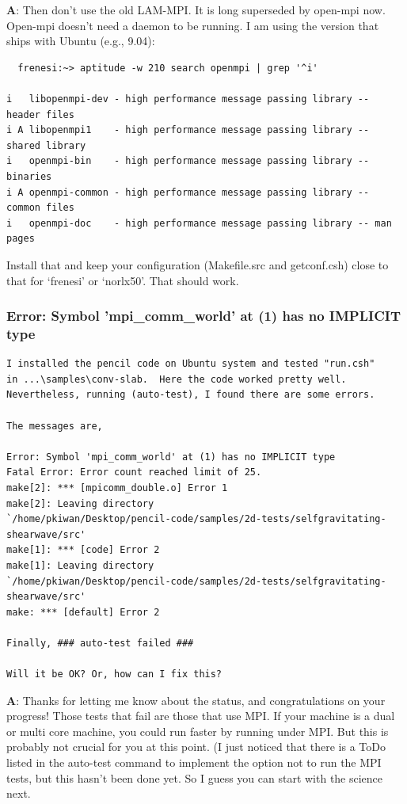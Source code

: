 \documentclass[\mydriver,12pt,twoside,notitlepage,a4paper]{article}
\begin{document}
\medskip

{\bf A}: Then don't use the old LAM-MPI. It is long superseded by open-mpi now.
Open-mpi doesn't need a daemon to be running. I am using the version that
ships with Ubuntu (e.g., 9.04):

\begin{Verbatim}
  frenesi:~> aptitude -w 210 search openmpi | grep '^i'

i   libopenmpi-dev - high performance message passing library -- header files
i A libopenmpi1    - high performance message passing library -- shared library
i   openmpi-bin    - high performance message passing library -- binaries
i A openmpi-common - high performance message passing library -- common files
i   openmpi-doc    - high performance message passing library -- man pages
\end{Verbatim}

Install that and keep your configuration (Makefile.src and getconf.csh)
close to that for `frenesi' or `norlx50'. That should work.

\subsubsection{Error: Symbol 'mpi_comm_world' at (1) has no IMPLICIT type}

\begin{Verbatim}
I installed the pencil code on Ubuntu system and tested "run.csh"
in ...\samples\conv-slab.  Here the code worked pretty well.
Nevertheless, running (auto-test), I found there are some errors.

The messages are,

Error: Symbol 'mpi_comm_world' at (1) has no IMPLICIT type
Fatal Error: Error count reached limit of 25.
make[2]: *** [mpicomm_double.o] Error 1
make[2]: Leaving directory
`/home/pkiwan/Desktop/pencil-code/samples/2d-tests/selfgravitating-shearwave/src'
make[1]: *** [code] Error 2
make[1]: Leaving directory
`/home/pkiwan/Desktop/pencil-code/samples/2d-tests/selfgravitating-shearwave/src'
make: *** [default] Error 2

Finally, ### auto-test failed ###

Will it be OK? Or, how can I fix this?
\end{Verbatim}

\medskip

{\bf A}: Thanks for letting me know about the status, and congratulations
on your progress! Those tests that fail are those that use MPI.
If your machine is a dual or multi core machine, you could run
faster by running under MPI. But this is probably not crucial for
you at this point. (I just noticed that there is a ToDo listed
in the auto-test command to implement the option not to run the
MPI tests, but this hasn't been done yet. So I guess you can start
with the science next.
\end{document}
